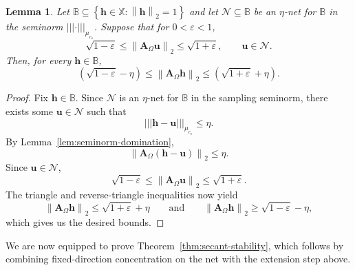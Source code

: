 \documentclass{article}
\theoremstyle{plain}
\newtheorem{lemma}[theorem]{Lemma}
\theoremstyle{definition}
\theoremstyle{remark}
\newcommand*{\snorm}[2]{\left\vert\!\left\vert\!\left\vert #1 \right\vert\!\right\vert\!\right\vert_{#2}}
\begin{document}
\begin{lemma}
  \label{lem:net-extension}
  Let $\mathbb{B}\subseteq \left\{\mathbf{h}\in\mathbb{X}:\left\|\mathbf{h}\right\|_2=1\right\}$ and let $\mathcal N\subseteq \mathbb{B}$ be an $\eta$-net for $\mathbb{B}$ in the seminorm $\snorm{\cdot}{\mu_{c_s}}$. Suppose that for $0<\varepsilon<1$,
  \[
    \sqrt{1-\varepsilon}
    \leq
    \left\|\mathbf{A}_\Omega\mathbf{u}\right\|_2
    \leq
    \sqrt{1+\varepsilon},
    \qquad
    \mathbf{u}\in\mathcal N.
  \]
  Then, for every $\mathbf{h}\in\mathbb{B}$,
  \[
    \left(\sqrt{1-\varepsilon}-\eta\right)
    \leq
    \left\|\mathbf{A}_\Omega\mathbf{h}\right\|_2
    \leq
    \left(\sqrt{1+\varepsilon}+\eta\right).
  \]
\end{lemma}


\begin{proof}
  Fix $\mathbf{h}\in\mathbb{B}$. Since $\mathcal N$ is an $\eta$-net for $\mathbb{B}$ in the sampling seminorm, there exists some $\mathbf{u}\in\mathcal N$ such that
  \[
    \snorm{\mathbf h - \mathbf u}{\mu_{c_s}}\leq \eta.
  \]
  By Lemma~\ref{lem:seminorm-domination},
  \[
    \left\|\mathbf{A}_\Omega\left(\mathbf{h}-\mathbf{u}\right)\right\|_2\leq \eta.
  \]
  Since $\mathbf{u}\in\mathcal N$,
  \[
    \sqrt{1-\varepsilon}
    \leq
    \left\|\mathbf{A}_\Omega\mathbf{u}\right\|_2
    \leq
    \sqrt{1+\varepsilon}.
  \]
  The triangle and reverse-triangle inequalities now yield
  \[
    \left\|\mathbf{A}_\Omega\mathbf{h}\right\|_2
    \leq
    \sqrt{1+\varepsilon}+\eta
    \qquad\text{and}\qquad
    \left\|\mathbf{A}_\Omega\mathbf{h}\right\|_2
    \geq
    \sqrt{1-\varepsilon}-\eta,
  \]
  which gives us the desired bounds.
\end{proof}

We are now equipped to prove Theorem~\ref{thm:secant-stability}, which follows by combining fixed-direction concentration on the net with the extension step above.
\end{document}
